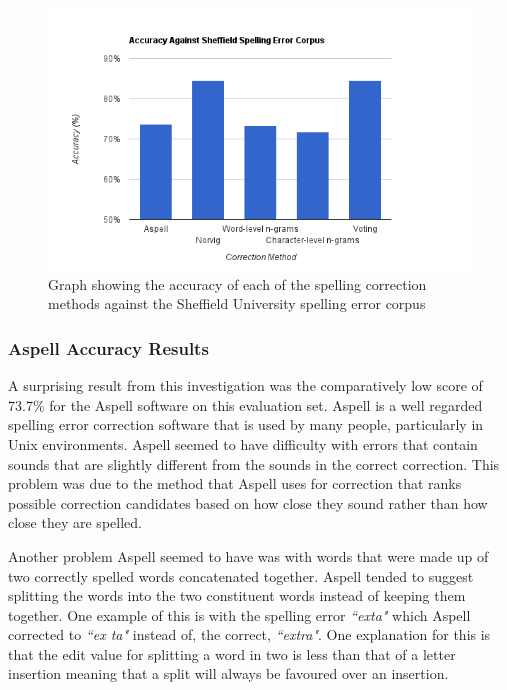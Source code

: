 \begin{figure}[H]
	\centering
	\label{fig:errorchart}
	\includegraphics[scale=0.65]{images/sheffieldaccuracy}
	\caption{Graph showing the accuracy of each of the spelling correction methods against the Sheffield University spelling error corpus}
\end{figure}

\subsubsection*{Aspell Accuracy Results}
A surprising result from this investigation was the comparatively low score of 73.7\% for the Aspell software on this evaluation set. Aspell is a well regarded spelling error correction software that is used by many people, particularly in Unix environments. Aspell seemed to have difficulty with errors that contain sounds that are slightly different from the sounds in the correct correction. This problem was due to the method that Aspell uses for correction that ranks possible correction candidates based on how close they sound rather than how close they are spelled.

Another problem Aspell seemed to have was with words that were made up of two correctly spelled words concatenated together. Aspell tended to suggest splitting the words into the two constituent words instead of keeping them together. One example of this is with the spelling error \emph{``exta"} which Aspell corrected to \emph{``ex ta"} instead of, the correct, \emph{``extra"}. One explanation for this is that the edit value for splitting a word in two is less than that of a letter insertion meaning that a split will always be favoured over an insertion.

